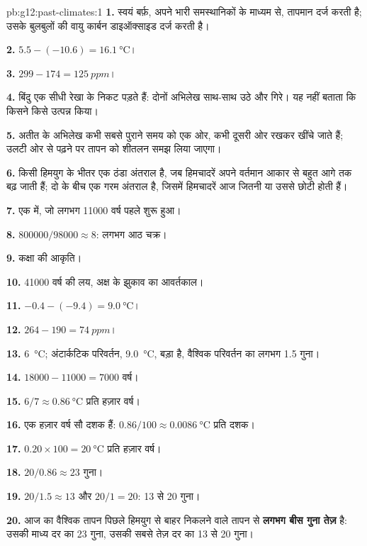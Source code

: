\begin{solution}{pb:g12:past-climates:1}
\textbf{1.} स्वयं बर्फ़, अपने भारी समस्थानिकों के माध्यम से,
तापमान दर्ज करती है; उसके बुलबुलों की वायु कार्बन डाइऑक्साइड दर्ज करती है।

\textbf{2.} $5.5 - (-10.6) = \qty{16.1}{\degreeCelsius}$।

\textbf{3.} $299 - 174 = \qty{125}{ppm}$।

\textbf{4.} बिंदु एक सीधी रेखा के निकट पड़ते हैं: दोनों अभिलेख साथ-साथ उठे
और गिरे। यह नहीं बताता कि किसने किसे उत्पन्न किया।

\textbf{5.} अतीत के अभिलेख कभी सबसे पुराने समय को एक ओर, कभी दूसरी ओर रखकर खींचे जाते हैं;
उलटी ओर से पढ़ने पर तापन को शीतलन समझ लिया जाएगा।

\textbf{6.}  किसी हिमयुग के भीतर एक ठंडा अंतराल है, जब
हिमचादरें अपने वर्तमान आकार से बहुत आगे तक बढ़ जाती हैं;  दो  के बीच
एक गरम अंतराल है, जिसमें हिमचादरें आज जितनी या उससे
छोटी होती हैं।

\textbf{7.} एक  में, जो लगभग \num{11000} वर्ष पहले शुरू हुआ।

\textbf{8.} $\num{800000}/\num{98000} \approx 8$: लगभग आठ चक्र।

\textbf{9.} कक्षा की आकृति।

\textbf{10.} \num{41000} वर्ष की लय, अक्ष के झुकाव का
आवर्तकाल।

\textbf{11.} $-0.4 - (-9.4) = \qty{9.0}{\degreeCelsius}$।

\textbf{12.} $264 - 190 = \qty{74}{ppm}$।

\textbf{13.} \qty{6}{\degreeCelsius}; अंटार्कटिक परिवर्तन, \qty{9.0}{\degreeCelsius},
बड़ा है, वैश्विक परिवर्तन का लगभग 1.5 गुना।

\textbf{14.} $\num{18000} - \num{11000} = \num{7000}$ वर्ष।

\textbf{15.} $6/7 \approx \qty{0.86}{\degreeCelsius}$ प्रति हज़ार वर्ष।

\textbf{16.} एक हज़ार वर्ष सौ दशक हैं: $0.86/100 \approx
\qty{0.0086}{\degreeCelsius}$ प्रति दशक।

\textbf{17.} $0.20 \times 100 = \qty{20}{\degreeCelsius}$ प्रति हज़ार वर्ष।

\textbf{18.} $20/0.86 \approx 23$ गुना।

\textbf{19.} $20/1.5 \approx 13$ और $20/1 = 20$: 13 से 20 गुना।

\textbf{20.} आज का वैश्विक तापन पिछले हिमयुग से बाहर निकलने वाले तापन से
\textbf{लगभग बीस गुना तेज़} है: उसकी माध्य दर का 23 गुना, उसकी सबसे तेज़ दर का
13 से 20 गुना।
\end{solution}

